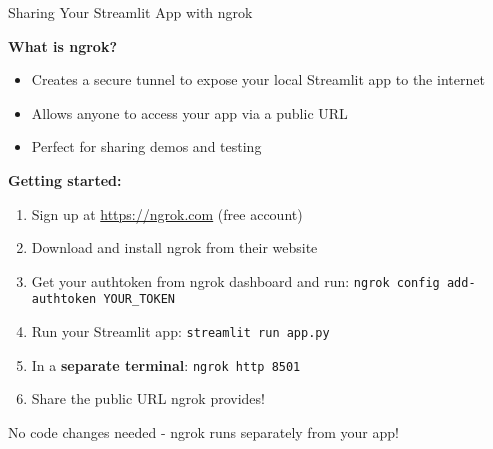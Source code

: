 \documentclass[aspectratio=169]{beamer}
\begin{document}
\begin{frame}{Sharing Your Streamlit App with ngrok}

\textbf{What is ngrok?}
\begin{itemize}
    \item Creates a secure tunnel to expose your local Streamlit app to the internet
    \item Allows anyone to access your app via a public URL
    \item Perfect for sharing demos and testing
\end{itemize}

\vspace{1em}

\textbf{Getting started:}
\begin{enumerate}
    \item Sign up at \url{https://ngrok.com} (free account)
    \item Download and install ngrok from their website
    \item Get your authtoken from ngrok dashboard and run: \texttt{ngrok config add-authtoken YOUR\_TOKEN}
    \item Run your Streamlit app: \texttt{streamlit run app.py}
    \item In a \textbf{separate terminal}: \texttt{ngrok http 8501}
    \item Share the public URL ngrok provides!
\end{enumerate}

\vspace{0.5em}

\small
No code changes needed - ngrok runs separately from your app!

\end{frame}
\end{document}
